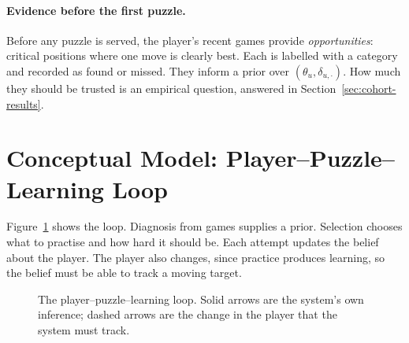 \paragraph{Evidence before the first puzzle.} Before any puzzle is served, the player's recent games
provide \emph{opportunities}: critical positions where one move is clearly best. Each is labelled with
a category and recorded as found or missed. They inform a prior over $(\theta_u,\delta_{u,\cdot})$.
How much they should be trusted is an empirical question, answered in
Section~\ref{sec:cohort-results}.

\section{Conceptual Model: Player--Puzzle--Learning Loop}

Figure~\ref{fig:loop} shows the loop. Diagnosis from games supplies a prior. Selection chooses what
to practise and how hard it should be. Each attempt updates the belief about the player. The player
also changes, since practice produces learning, so the belief must be able to track a moving
target.

\begin{figure}[H]
\centering
{}
\caption{The player--puzzle--learning loop. Solid arrows are the system's own inference; dashed arrows
are the change in the player that the system must track.}\label{fig:loop}
\end{figure}

